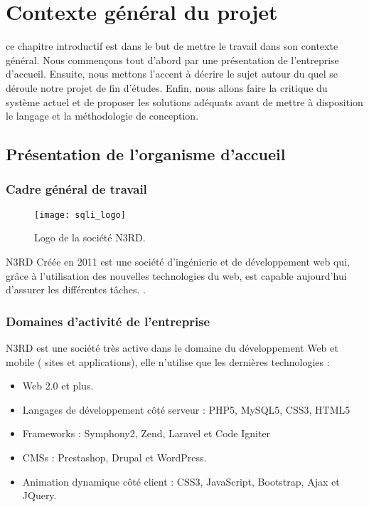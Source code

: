 \chapter{Contexte général du projet}
\label{chap:premierchapitre}

\begin{fquote}ce chapitre introductif est dans le but de mettre le travail dans son contexte général.
	Nous commençons tout d’abord par une présentation de l’entreprise d’accueil. Ensuite, nous
	mettons l’accent à décrire le sujet autour du quel se déroule notre projet de fin d’études. Enfin,
	nous allons faire la critique du système actuel et de proposer les solutions adéquats avant de
	mettre à disposition le langage et la méthodologie de conception.
 \end{fquote}

\clearpage
\section{Présentation de l’organisme d’accueil}

\subsection{Cadre général de travail}

\begin{figure}[hbt!]
  \centering
  \texttt{[image: sqli\_logo]}
  \caption{Logo de la société N3RD.}
  \label{fig:logo-sqli}
\end{figure}
N3RD Créée en 2011 est une société d’ingénierie et de développement web qui, grâce à
l’utilisation des nouvelles technologies du web, est capable aujourd’hui d’assurer les différentes
tâches. \cite{wiki:sqli}.
\smallskip
\subsection{Domaines d’activité de l'entreprise}
N3RD est une société très active dans le domaine du développement Web et mobile ( sites
et applications), elle n’utilise que les dernières technologies :
\medskip
\begin{itemize}
  \item Web 2.0 et plus.
  \smallskip
  \item  Langages de développement côté serveur : PHP5, MySQL5, CSS3, HTML5
  \smallskip
  \item  Frameworks : Symphony2, Zend, Laravel et Code Igniter
  \smallskip
  \item CMSs : Prestashop, Drupal et WordPress.
  \smallskip
    \item Animation dynamique côté client : CSS3, JavaScript, Bootstrap, Ajax et JQuery.
  \smallskip
\end{itemize}
\medskip
